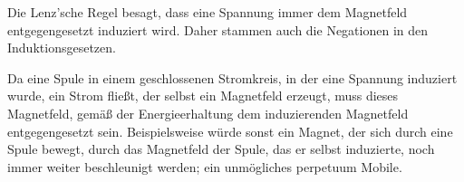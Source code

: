 Die Lenz'sche Regel besagt, dass eine Spannung immer dem Magnetfeld entgegengesetzt induziert wird. Daher stammen auch die Negationen in den Induktionsgesetzen.

Da eine Spule in einem geschlossenen Stromkreis, in der eine Spannung induziert wurde, ein Strom fließt, der selbst ein Magnetfeld erzeugt, muss dieses Magnetfeld, gemäß der Energieerhaltung dem induzierenden Magnetfeld entgegengesetzt sein. Beispielsweise würde sonst ein Magnet, der sich durch eine Spule bewegt, durch das Magnetfeld der Spule, das er selbst induzierte, noch immer weiter beschleunigt werden; ein unmögliches perpetuum Mobile.